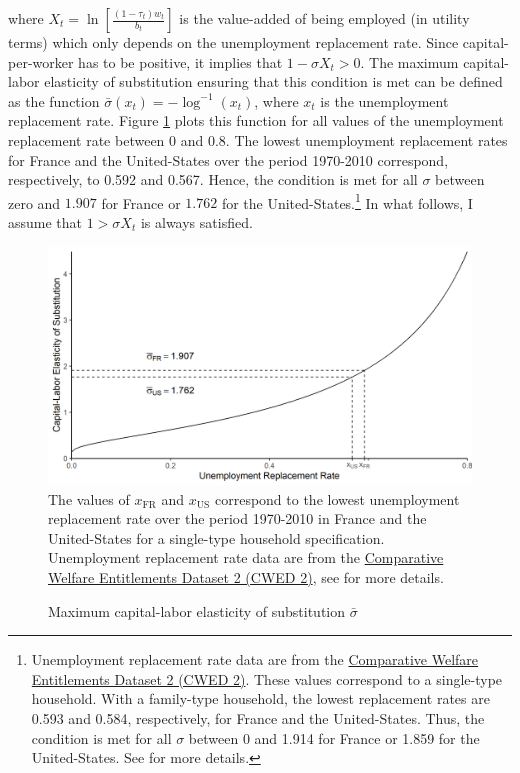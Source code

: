 where $X_t=\ln\left[\frac{(1-\tau_t)w_t}{b_t}\right]$ is the value-added of being employed (in utility terms) which only depends on the unemployment replacement rate. Since capital-per-worker has to be positive, it implies that $1-\sigma X_t > 0$. The maximum capital-labor elasticity of substitution ensuring that this condition is met can be defined as the function $\bar{\sigma}(x_t) = -\log^{-1}(x_t)$, where $x_t$ is the unemployment replacement rate. Figure \ref{fig:xsigma} plots this function for all values of the unemployment replacement rate between 0 and 0.8. The lowest unemployment replacement rates for France and the United-States over the period 1970-2010 correspond, respectively, to 0.592 and 0.567. Hence, the condition is met for all $\sigma$ between zero and $1.907$ for France or $1.762$ for the United-States.\footnote{Unemployment replacement rate data are from the \href{http://cwed2.org/}{Comparative Welfare Entitlements Dataset 2 (CWED 2)}. These values correspond to a single-type household. With a family-type household, the lowest replacement rates are 0.593 and 0.584, respectively, for France and the United-States. Thus, the condition is met for all $\sigma$ between 0 and 1.914 for France or 1.859 for the United-States. See \cite{CWED2017} for more details.} In what follows, I assume that $1>\sigma X_t$ is always satisfied.
	\begin{figure}[tb]
		\centering
		\caption{Maximum capital-labor elasticity of substitution $\bar{\sigma}$}
		\label{fig:xsigma}
		\includegraphics[width = 1\linewidth]{../result/xsigma.png}
		\vspace{-6ex}
		\justify\singlespacing\footnotesize The values of $x_{\text{FR}}$ and $x_{\text{US}}$ correspond to the lowest unemployment replacement rate over the period 1970-2010 in France and the United-States for a single-type household specification. Unemployment replacement rate data are from the \href{http://cwed2.org/}{Comparative Welfare Entitlements Dataset 2 (CWED 2)}, see \cite{CWED2017} for more details.
	\end{figure}


